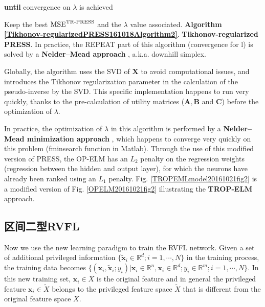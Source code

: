 \textbf{until} convergence on $\lambda$ is achieved

Keep the best $\textup{MSE}^{\textup{TR-PRESS}}$ and the $\lambda$ value associated.
\textbf{Algorithm \ref{Tikhonov-regularizedPRESS161018Algorithm2}}. \textbf{Tikhonov-regularized PRESS}. In practice, the REPEAT part of this algorithm (convergence for l) is solved by a \textbf{Nelder–Mead approach}  \cite{Nelder1965A}, a.k.a. downhill simplex.

Globally, the algorithm uses the SVD of $\bm X$ to avoid computational issues, and introduces the Tikhonov regularization parameter in the calculation of the pseudo-inverse by the SVD. This specific implementation happens to run very quickly, thanks to the pre-calculation of utility matrices ($\bm A, \bm B$ and $\bm C$) before the optimization of $\lambda$.

In practice, the optimization of $\lambda$ in this algorithm is performed by a \textbf{Nelder–Mead minimization approach} \cite{Nelder1965A}, which happens to converge very quickly on this problem (fminsearch function in Matlab). Through the use of this modified version of PRESS, the OP-ELM has an $L_2$ penalty on the regression weights (regression between the hidden and output layer), for which the neurons have already been ranked using an $L_1$ penalty. Fig. \ref{TROPEMLmodel20161021fig2} is a modified version of Fig. \ref{OPELM20161021fig2} illustrating the \textbf{TROP-ELM} approach.
\subsection{区间二型RVFL}
Now we use the new learning paradigm to train the RVFL network. Given a set of additional privileged information
$\{\widetilde {\bm x}_i \in \mathbb R^d; i = 1,\cdots,N\}$ in the training process, the training data becomes $\{(\bm x_i,\widetilde {\bm x}_i; y_i)|\bm x_i \in \mathbb R^n, {\bm x}_i\in \mathbb R^d; y_i\in \mathbb R^m; i =1,\cdots,N\}$. In this new training set, $\bm x_i \in X$ is the original feature and in general the privileged feature $\bm x_i \in \widetilde X$ belongs to the privileged feature space $\widetilde X$ that is different from the original feature space $X$.


